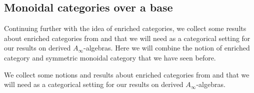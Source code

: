 \documentclass[Thesis.tex]{subfiles}
\begin{document}
\subsection{Monoidal categories over a base}




Continuing further with the idea of enriched categories, we collect some results about enriched categories from \cite{riehl} and \cite[\S 4.2]{whitehouse} that we will need as a categorical setting for our results on derived $A_\infty$-algebras. Here we will combine the notion of enriched category and symmetric monoidal category that we have seen before.

We collect some notions and results about enriched categories from \cite{riehl} and \cite[\S 4.2]{whitehouse} that we will need as a categorical setting for our results on derived $A_\infty$-algebras.
\end{document}

